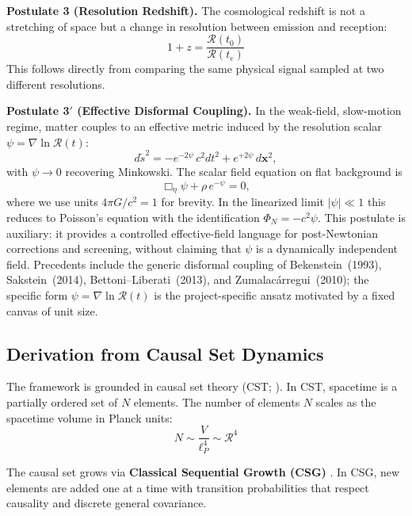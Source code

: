 \documentclass[12pt]{article}
\begin{document}
{\bf Postulate 3 (Resolution Redshift).} The cosmological redshift is not a stretching of space but a change in resolution between emission and reception:
\begin{equation}
1 + z = \frac{\mathcal{R}(t_0)}{\mathcal{R}(t_e)}
\end{equation}
This follows directly from comparing the same physical signal sampled at two different resolutions.

{\bf Postulate 3$'$ (Effective Disformal Coupling).}
In the weak-field, slow-motion regime, matter couples to an effective
metric induced by the resolution scalar $\psi=\nabla\ln\mathcal{R}(t)$:
\begin{equation}
d\tilde s^2 = -e^{-2\psi}\,c^2dt^2 + e^{+2\psi}\,d\mathbf{x}^2 ,
\label{eq:post3p-metric}
\end{equation}
with $\psi\to0$ recovering Minkowski.
The scalar field equation on flat background is
\begin{equation}
\Box_\eta\psi + \rho\,e^{-\psi}=0 ,
\label{eq:post3p-field}
\end{equation}
where we use units $4\pi G/c^2=1$ for brevity.
In the linearized limit $|\psi|\ll1$ this reduces to Poisson's equation
with the identification $\Phi_N=-c^2\psi$.
This postulate is auxiliary: it provides a controlled effective-field
language for post-Newtonian corrections and screening, without claiming
that $\psi$ is a dynamically independent field.
Precedents include the generic disformal coupling of Bekenstein~(1993),
Sakstein~(2014), Bettoni--Liberati~(2013), and Zumalac\'arregui~(2010);
the specific form $\psi=\nabla\ln\mathcal{R}(t)$ is the project-specific
ansatz motivated by a fixed canvas of unit size.

\subsection{Derivation from Causal Set Dynamics}
\label{sec:csg}

The framework is grounded in causal set theory (CST; \citealp{bombelli1987}). In CST, spacetime is a partially ordered set of $N$ elements. The number of elements $N$ scales as the spacetime volume in Planck units:
\begin{equation}
N \sim \frac{V}{\ell_P^4} \sim \mathcal{R}^4
\end{equation}

The causal set grows via {\bf Classical Sequential Growth (CSG)} \citep{rideout2000}. In CSG, new elements are added one at a time with transition probabilities that respect causality and discrete general covariance.
\end{document}
